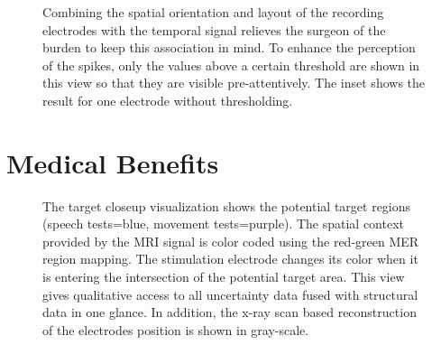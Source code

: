 \documentclass{egpubl}
\begin{document}
\begin{figure}[t]
    \centering
    \caption{Combining the spatial orientation and layout of the recording electrodes with the temporal signal relieves the surgeon of the burden to keep this association in mind. To enhance the perception of the spikes, only the values above a certain threshold are shown in this view so that they are visible pre-attentively. The inset shows the result for one electrode without thresholding.}
    \label{fig:recordingphase:3dsound}
\end{figure}


\section{Medical Benefits}\label{sec:benefits}
\begin{figure}[t]
  \centering
  \caption{The target closeup visualization shows the potential target regions (speech tests=blue, movement tests=purple). The spatial context provided by the MRI signal is color coded using the red-green MER region mapping. The stimulation electrode changes its color when it is entering the intersection of the potential target area. This view gives qualitative access to all uncertainty data fused with structural data in one glance. In addition, the x-ray scan based reconstruction of the electrodes position is shown in gray-scale.}
  \label{fig:targetregion}
\end{figure}
\end{document}
